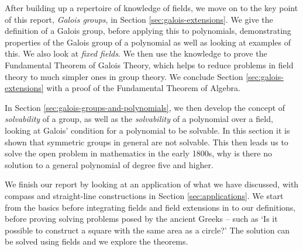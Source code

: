 After building up a repertoire of knowledge of fields, we move on to the key point of this report, \textit{Galois groups}, in Section \ref{sec:galois-extensions}. We give the definition of a Galois group, before applying this to polynomials, demonstrating properties of the Galois group of a polynomial as well as looking at examples of this. We also look at \textit{fixed fields}.  We then use the knowledge to prove the Fundamental Theorem of Galois Theory, which helps to reduce problems in field theory to much simpler ones in group theory. We conclude Section \ref{sec:galois-extensions} with a proof of the Fundamental Theorem of Algebra.

In Section \ref{sec:galois-groups-and-polynomials}, we then develop the concept of \textit{solvability} of a group, as well as the \textit{solvability} of a polynomial over a field, looking at Galois’ condition for a polynomial to be solvable. In this section it is shown that symmetric groups in general are not solvable. This then leads us to solve the open problem in mathematics in the early 1800s, why is there no solution to a general polynomial of degree five and higher.

We finish our report by looking at an application of what we have discussed, with compass and straight-line constructions in Section \ref{sec:applications}. We start from the basics before integrating fields and field extensions in to our definitions, before proving solving problems posed by the ancient Greeks – such as ‘Is it possible to construct a square with the same area as a circle?’ The solution can be solved using fields and we explore the theorems.
